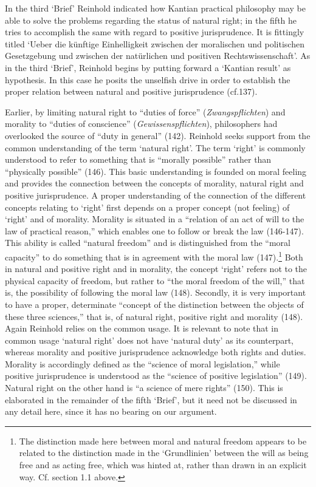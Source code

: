  In the third `Brief' Reinhold indicated how Kantian practical philosophy may be able to solve the problems regarding the status of natural right; in the fifth he tries to accomplish the same with regard to positive jurisprudence. It is fittingly titled `Ueber die k\"{u}nftige Einhelligkeit zwischen der moralischen und politischen Gesetzgebung und zwischen der nat\"{u}rlichen und positiven Rechtswissenschaft'. As in the third `Brief', Reinhold begins by putting forward a `Kantian result' as hypothesis. In this case he posits the unselfish drive in order to establish the proper relation between natural and positive jurisprudence (cf.137).

 Earlier, by limiting natural right to ``duties of force'' (\textit{Zwangspflichten}) and morality to ``duties of conscience'' (\textit{Gewissenspflichten}), philosophers had overlooked the source of ``duty in general'' (142). Reinhold seeks support from the common understanding of the term `natural right'. The term `right' is commonly understood to refer to something that is ``morally possible'' rather than ``physically possible'' (146). This basic understanding is founded on moral feeling and provides the connection between the concepts of morality, natural right and positive jurisprudence. A proper understanding of the connection of the different concepts relating to `right' first depends on a proper concept (not feeling) of `right' and of morality. Morality is situated in a ``relation of an act of will to the law of practical reason,'' which enables one to follow or break the law (146{-}147). This ability is called ``natural freedom'' and is distinguished from the ``moral capacity'' to do something that is in agreement with the moral law (147).\footnote{ The distinction made here between moral and natural freedom appears to be related to the distinction made in the `Grundlinien' between the will as being free and as acting free, which was hinted at, rather than drawn in an explicit way. Cf. section 1.1 above. } Both in natural and positive right and in morality, the concept `right' refers not to the physical capacity of freedom, but rather to ``the moral freedom of the will,'' that is, the possibility of following the moral law (148). Secondly, it is very important to have a proper, determinate ``concept of the distinction between the objects of these three sciences,'' that is, of natural right, positive right and morality (148). Again Reinhold relies on the common usage. It is relevant to note that in common usage `natural right' does not have `natural duty' as its counterpart, whereas morality and positive jurisprudence acknowledge both rights and duties. Morality is accordingly defined as the ``science of moral legislation,'' while positive jurisprudence is understood as the ``science of positive legislation'' (149). Natural right on the other hand is ``a science of mere rights'' (150). This is elaborated in the remainder of the fifth `Brief', but it need not be discussed in any detail here, since it has no bearing on our argument. 


